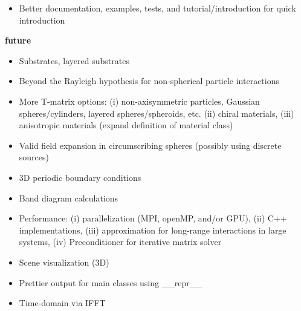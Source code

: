 \documentclass[11pt]{article}
\begin{document}
\begin{enumerate*}
\begin{itemize}[label={\tiny\raisebox{1ex}{\textbullet}}]
            \item Better documentation, examples, tests, and tutorial/introduction for quick introduction
        \end{itemize}
    \item \textbf{future}
        \begin{itemize}[label={\tiny\raisebox{1ex}{\textbullet}}]
            \item Substrates, layered substrates
            \item Beyond the Rayleigh hypothesis for non-spherical particle interactions
            \item More T-matrix options:
                        (i) non-axisymmetric particles, Gaussian spheres/cylinders, layered spheres/spheroids, etc.
                        (ii) chiral materials,
                        (iii) anisotropic materials (expand definition of material class)
                    \item Valid field expansion in circumscribing spheres (possibly using discrete sources)
            \item 3D periodic boundary conditions
            \item Band diagram calculations
            \item Performance:
                      (i) parallelization (MPI, openMP, and/or GPU),
                      (ii) C++ implementations,
                      (iii) approximation for long-range interactions in large systems,
                      (iv) Preconditioner for iterative matrix solver
            \item Scene visualization (3D)
            \item Prettier output for main classes using \_\_repr\_\_
            \item Time-domain via IFFT
        \end{itemize}
\end{enumerate*}



{}
\end{document}
